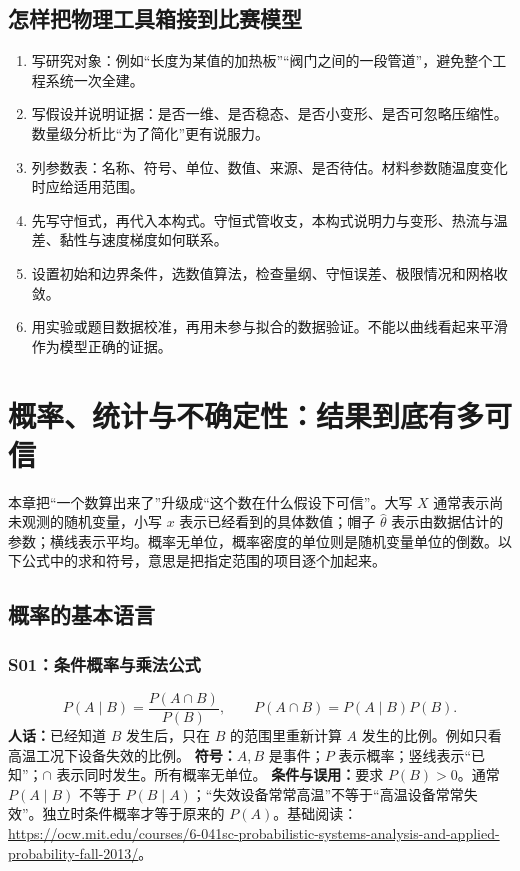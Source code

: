 \documentclass[UTF8,zihao=-4,openany,oneside,fontset=windows]{ctexbook}
\begin{document}
\section{怎样把物理工具箱接到比赛模型}
\begin{enumerate}
\item 写研究对象：例如“长度为某值的加热板”“阀门之间的一段管道”，避免整个工程系统一次全建。
\item 写假设并说明证据：是否一维、是否稳态、是否小变形、是否可忽略压缩性。数量级分析比“为了简化”更有说服力。
\item 列参数表：名称、符号、单位、数值、来源、是否待估。材料参数随温度变化时应给适用范围。
\item 先写守恒式，再代入本构式。守恒式管收支，本构式说明力与变形、热流与温差、黏性与速度梯度如何联系。
\item 设置初始和边界条件，选数值算法，检查量纲、守恒误差、极限情况和网格收敛。
\item 用实验或题目数据校准，再用未参与拟合的数据验证。不能以曲线看起来平滑作为模型正确的证据。
\end{enumerate}

\chapter{概率、统计与不确定性：结果到底有多可信}
本章把“一个数算出来了”升级成“这个数在什么假设下可信”。大写 $X$ 通常表示尚未观测的随机变量，小写 $x$ 表示已经看到的具体数值；帽子 $\hat{\theta}$ 表示由数据估计的参数；横线表示平均。概率无单位，概率密度的单位则是随机变量单位的倒数。以下公式中的求和符号，意思是把指定范围的项目逐个加起来。

\section{概率的基本语言}
\subsection{S01：条件概率与乘法公式}
\begin{equation}
 P(A\mid B)=\frac{P(A\cap B)}{P(B)},\qquad P(A\cap B)=P(A\mid B)P(B).
\end{equation}
\textbf{人话：}已经知道 $B$ 发生后，只在 $B$ 的范围里重新计算 $A$ 发生的比例。例如只看高温工况下设备失效的比例。
\textbf{符号：}$A,B$ 是事件；$P$ 表示概率；竖线表示“已知”；$\cap$ 表示同时发生。所有概率无单位。
\textbf{条件与误用：}要求 $P(B)>0$。通常 $P(A\mid B)$ 不等于 $P(B\mid A)$；“失效设备常常高温”不等于“高温设备常常失效”。独立时条件概率才等于原来的 $P(A)$。基础阅读：\url{https://ocw.mit.edu/courses/6-041sc-probabilistic-systems-analysis-and-applied-probability-fall-2013/}。
\end{document}
